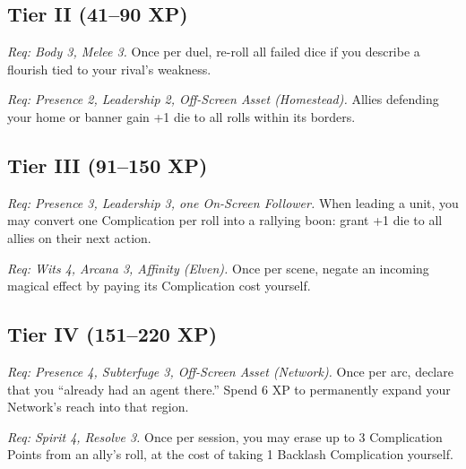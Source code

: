 \documentclass[12pt]{article}
\begin{document}
\subsection*{Tier II (41--90 XP)}
\begin{description}[leftmargin=2cm]
  \item[Duelist’s Insight]  
  \emph{Req: Body 3, Melee 3.}  
  Once per duel, re-roll all failed dice if you describe a flourish tied to your rival’s weakness.  

  \item[Hearth-Banner]  
  \emph{Req: Presence 2, Leadership 2, Off-Screen Asset (Homestead).}  
  Allies defending your home or banner gain +1 die to all rolls within its borders.  
\end{description}

\subsection*{Tier III (91--150 XP)}
\begin{description}[leftmargin=2cm]
  \item[Oath-Bound Captain]  
  \emph{Req: Presence 3, Leadership 3, one On-Screen Follower.}  
  When leading a unit, you may convert one Complication per roll into a rallying boon: grant +1 die to all allies on their next action.  

  \item[Echo-Killer]  
  \emph{Req: Wits 4, Arcana 3, Affinity (Elven).}  
  Once per scene, negate an incoming magical effect by paying its Complication cost yourself.  
\end{description}

\subsection*{Tier IV (151--220 XP)}
\begin{description}[leftmargin=2cm]
  \item[Shadow Broker]  
  \emph{Req: Presence 4, Subterfuge 3, Off-Screen Asset (Network).}  
  Once per arc, declare that you ``already had an agent there.''  
  Spend 6 XP to permanently expand your Network’s reach into that region.  

  \item[Spirit-Shield]  
  \emph{Req: Spirit 4, Resolve 3.}  
  Once per session, you may erase up to 3 Complication Points from an ally’s roll, at the cost of taking 1 Backlash Complication yourself.  
\end{description}
\end{document}
